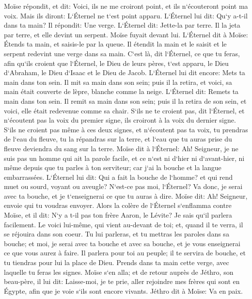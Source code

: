 \verse Moïse répondit, et dit: Voici, ils ne me croiront point, et ils n`écouteront point ma voix. Mais ils diront: L`Éternel ne t`est point apparu. 
\verse L`Éternel lui dit: Qu`y a-t-il dans ta main? Il répondit: Une verge. 
\verse L`Éternel dit: Jette-la par terre. Il la jeta par terre, et elle devint un serpent. Moïse fuyait devant lui. 
\verse L`Éternel dit à Moïse: Étends ta main, et saisis-le par la queue. Il étendit la main et le saisit et le serpent redevint une verge dans sa main. 
\verse C`est là, dit l`Éternel, ce que tu feras, afin qu`ils croient que l`Éternel, le Dieu de leurs pères, t`est apparu, le Dieu d`Abraham, le Dieu d`Isaac et le Dieu de Jacob. 
\verse L`Éternel lui dit encore: Mets ta main dans ton sein. Il mit sa main dans son sein; puis il la retira, et voici, sa main était couverte de lèpre, blanche comme la neige. 
\verse L`Éternel dit: Remets ta main dans ton sein. Il remit sa main dans son sein; puis il la retira de son sein, et voici, elle était redevenue comme sa chair. 
\verse S`ils ne te croient pas, dit l`Éternel, et n`écoutent pas la voix du premier signe, ils croiront à la voix du dernier signe. 
\verse S`ils ne croient pas même à ces deux signes, et n`écoutent pas ta voix, tu prendras de l`eau du fleuve, tu la répandras sur la terre, et l`eau que tu auras prise du fleuve deviendra du sang sur la terre. 
\verse Moïse dit à l`Éternel: Ah! Seigneur, je ne suis pas un homme qui ait la parole facile, et ce n`est ni d`hier ni d`avant-hier, ni même depuis que tu parles à ton serviteur; car j`ai la bouche et la langue embarrassées. 
\verse L`Éternel lui dit: Qui a fait la bouche de l`homme? et qui rend muet ou sourd, voyant ou aveugle? N`est-ce pas moi, l`Éternel? 
\verse Va donc, je serai avec ta bouche, et je t`enseignerai ce que tu auras à dire. 
\verse Moïse dit: Ah! Seigneur, envoie qui tu voudras envoyer. 
\verse Alors la colère de l`Éternel s`enflamma contre Moïse, et il dit: N`y a t-il pas ton frère Aaron, le Lévite? Je sais qu`il parlera facilement. Le voici lui-même, qui vient au-devant de toi; et, quand il te verra, il se réjouira dans son coeur. 
\verse Tu lui parleras, et tu mettras les paroles dans sa bouche; et moi, je serai avec ta bouche et avec sa bouche, et je vous enseignerai ce que vous aurez à faire. 
\verse Il parlera pour toi au peuple; il te servira de bouche, et tu tiendras pour lui la place de Dieu. 
\verse Prends dans ta main cette verge, avec laquelle tu feras les signes. 
\verse Moïse s`en alla; et de retour auprès de Jéthro, son beau-père, il lui dit: Laisse-moi, je te prie, aller rejoindre mes frères qui sont en Égypte, afin que je voie s`ils sont encore vivants. Jéthro dit à Moïse: Va en paix. 

